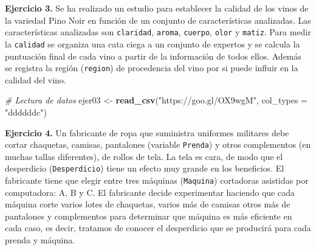 \documentclass[
]{book}
\newenvironment{Shaded}{\begin{snugshade}}{\end{snugshade}}
\newcommand{\CommentTok}[1]{\textcolor[rgb]{0.56,0.35,0.01}{\textit{#1}}}
\newcommand{\DataTypeTok}[1]{\textcolor[rgb]{0.13,0.29,0.53}{#1}}
\newcommand{\KeywordTok}[1]{\textcolor[rgb]{0.13,0.29,0.53}{\textbf{#1}}}
\newcommand{\NormalTok}[1]{#1}
\newcommand{\OperatorTok}[1]{\textcolor[rgb]{0.81,0.36,0.00}{\textbf{#1}}}
\newcommand{\StringTok}[1]{\textcolor[rgb]{0.31,0.60,0.02}{#1}}
\theoremstyle{definition}
\theoremstyle{definition}
\theoremstyle{definition}
\theoremstyle{remark}
\begin{document}
\begin{Shaded}
\end{Shaded}

\textbf{Ejercicio 3.} Se ha realizado un estudio para establecer la calidad de los vinos de la variedad Pino Noir en función de un conjunto de características analizadas. Las características analizadas son \texttt{claridad}, \texttt{aroma}, \texttt{cuerpo}, \texttt{olor} y \texttt{matiz}. Para medir la \texttt{calidad} se organiza una cata ciega a un conjunto de expertos y se calcula la puntuación final de cada vino a partir de la información de todos ellos. Además se registra la región (\texttt{region}) de procedencia del vino por si puede influir en la calidad del vino.

\begin{Shaded}
\begin{Highlighting}[]
\CommentTok{# Lectura de datos}
\NormalTok{ejer03 <-}\StringTok{ }\KeywordTok{read_csv}\NormalTok{(}\StringTok{"https://goo.gl/OX9wgM"}\NormalTok{, }\DataTypeTok{col_types =} \StringTok{"ddddddc"}\NormalTok{)}
\end{Highlighting}
\end{Shaded}

\textbf{Ejercicio 4.} Un fabricante de ropa que suministra uniformes militares debe cortar chaquetas, camisas, pantalones (variable \texttt{Prenda}) y otros complementos (en muchas tallas diferentes), de rollos de tela. La tela es cara, de modo que el desperdicio (\texttt{Desperdicio}) tiene un efecto muy grande en los beneficios. El fabricante tiene que elegir entre tres máquinas (\texttt{Maquina}) cortadoras asistidas por computadora: A, B y C. El fabricante decide experimentar haciendo que cada máquina corte varios lotes de chaquetas, varios más de camisas otros más de pantalones y complementos para determinar que máquina es más eficiente en cada caso, es decir, tratamos de conocer el desperdicio que se producirá para cada prenda y máquina.
\end{document}
